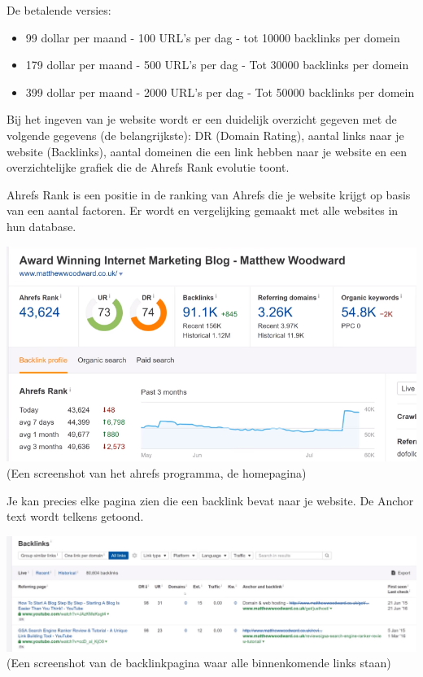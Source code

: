 De betalende versies: 
\begin{itemize}
\item 99 dollar per maand - 100 URL's per dag - tot 10000 backlinks per domein
\item 179 dollar per maand - 500 URL's per dag - Tot 30000 backlinks per domein
\item 399 dollar per maand - 2000 URL's per dag - Tot 50000 backlinks per domein
\end{itemize}

Bij het ingeven van je website wordt er een duidelijk overzicht gegeven met de volgende gegevens (de belangrijkste): DR (Domain Rating), aantal links naar je website (Backlinks), aantal domeinen die een link hebben naar je website en een overzichtelijke grafiek die de Ahrefs Rank evolutie toont. 

Ahrefs Rank is een positie in de ranking van Ahrefs die je website krijgt op basis van een aantal factoren. Er wordt en vergelijking gemaakt met alle websites in hun database.

\includegraphics[width=\linewidth]{Bachelorproef/bachelor/img/ahrefs.PNG}
(Een screenshot van het ahrefs programma, de homepagina)

Je kan precies elke pagina zien die een backlink bevat naar je website. De Anchor text wordt telkens getoond.

\includegraphics[width=\linewidth]{Bachelorproef/bachelor/img/ahrefsbacklink.PNG}
(Een screenshot van de backlinkpagina waar alle binnenkomende links staan)

